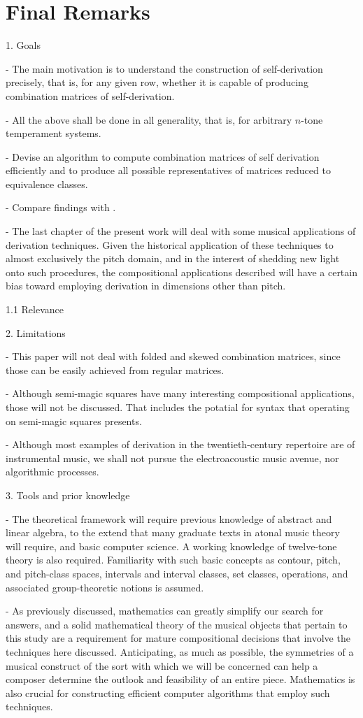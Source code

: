 \section{Final Remarks}

1. Goals

- The main motivation is to understand the construction of self-derivation precisely, that is, for any given row, whether it is capable of producing combination matrices of self-derivation.

- All the above shall be done in all generality, that is, for arbitrary $n$-tone temperament systems.

- Devise an algorithm to compute combination matrices of self derivation efficiently and to produce all possible representatives of matrices reduced to equivalence classes.

- Compare findings with \cite{Kowalski1987b}.

- The last chapter of the present work will deal with some musical applications of derivation techniques. Given the historical application of these techniques to almost exclusively the pitch domain, and in the interest of shedding new light onto such procedures, the compositional applications described will have a certain bias toward employing derivation in dimensions other than pitch.

1.1 Relevance

2. Limitations

- This paper will not deal with folded and skewed combination matrices, since those can be easily achieved from regular matrices.

- Although semi-magic squares have many interesting compositional applications, those will not be discussed. That includes the potatial for syntax that operating on semi-magic squares presents.

- Although most examples of derivation in the twentieth-century repertoire are of instrumental music, we shall not pursue the electroacoustic music avenue, nor algorithmic processes.

3. Tools and prior knowledge

- The theoretical framework will require previous knowledge of abstract and linear algebra, to the extend that many graduate texts in atonal music theory will require, and basic computer science. A working knowledge of twelve-tone theory is also required. Familiarity with such basic concepts as contour, pitch, and pitch-class spaces, intervals and interval classes, set classes, operations, and associated group-theoretic notions is assumed.

- As previously discussed, mathematics can greatly simplify our search for answers, and a solid mathematical theory of the musical objects that pertain to this study are a requirement for mature compositional decisions that involve the techniques here discussed. Anticipating, as much as possible, the symmetries of a musical construct of the sort with which we will be concerned can help a composer determine the outlook and feasibility of an entire piece. Mathematics is also crucial for constructing efficient computer algorithms that employ such techniques.
